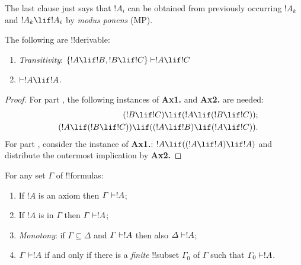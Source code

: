 \documentclass[../../include/open-logic-section]{subfiles}
\begin{document}
\begin{explain}
The last clause just says that $!A_i$ can be obtained from
previously occurring $!A_k$ and $!A_k \lif !A_i$ by
\emph{modus ponens} (MP). 
\end{explain}

\begin{prop}
 The following are !!{derivable}:
  \begin{enumerate}
  \item \emph{Transitivity}: $\{!A\lif !B, !B\lif !C\} \Proves
    !A\lif!C$
  \item $\Proves !A \lif !A$. 
  \end{enumerate}
\end{prop}

\begin{proof}
  For part , the following instances
  of \textbf{Ax1.} and \textbf{Ax2.} are needed:
  \begin{eqnarray*}
    &&(!B \lif !C) \lif (!A \lif (!B \lif !C)); \\
    && (!A \lif (!B \lif !C)) \lif ((!A \lif !B) \lif
    (!A \lif !C)).
  \end{eqnarray*}
For part , consider the instance of
\textbf{Ax1.}: $!A \lif ((!A \lif !A) \lif
!A)$ and distribute the outermost implication by \textbf{Ax2.}
\end{proof}

\begin{prop}
  For any set $\Gamma$ of !!{formula}s:
  \begin{enumerate}
  \item If $!A$ is an axiom then $\Gamma \Proves !A$;
  \item If $!A$ is in $\Gamma$ then $\Gamma \Proves
    !A$;
  \item \emph{Monotony}: if $\Gamma \subseteq \Delta$ and $\Gamma
    \Proves !A$ then also $\Delta \Proves
    !A$; 
  \item $\Gamma \Proves !A$ if and only if there is a
    \emph{finite} !!{subset} $\Gamma_0$ of $\Gamma$ such that $\Gamma_0
    \Proves !A$.
  \end{enumerate}
\end{prop}
\end{document}
